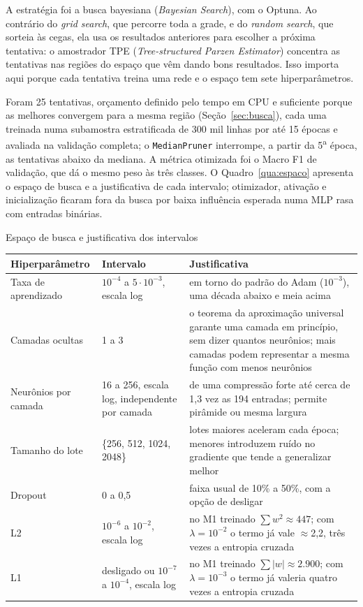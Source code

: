 A estratégia foi a busca bayesiana (\textit{Bayesian Search}), com o Optuna. Ao contrário do \textit{grid search}, que percorre toda a grade, e do \textit{random search}, que sorteia às cegas, ela usa os resultados anteriores para escolher a próxima tentativa: o amostrador TPE (\textit{Tree-structured Parzen Estimator}) concentra as tentativas nas regiões do espaço que vêm dando bons resultados. Isso importa aqui porque cada tentativa treina uma rede e o espaço tem sete hiperparâmetros.

Foram 25 tentativas, orçamento definido pelo tempo em CPU e suficiente porque as melhores convergem para a mesma região (Seção~\ref{sec:busca}), cada uma treinada numa subamostra estratificada de 300 mil linhas por até 15 épocas e avaliada na validação completa; o \texttt{MedianPruner} interrompe, a partir da 5\textsuperscript{a} época, as tentativas abaixo da mediana. A métrica otimizada foi o Macro F1 de validação, que dá o mesmo peso às três classes. O Quadro~\ref{qua:espaco} apresenta o espaço de busca e a justificativa de cada intervalo; otimizador, ativação e inicialização ficaram fora da busca por baixa influência esperada numa MLP rasa com entradas binárias.

\begin{quadro}[!htbp]
\caption{Espaço de busca e justificativa dos intervalos}
\label{qua:espaco}
\begin{center}
\footnotesize
\begin{tabularx}{\textwidth}{|P{2.6cm}|P{3.2cm}|Y|}
\hline
\textbf{Hiperparâmetro} & \textbf{Intervalo} & \textbf{Justificativa} \\ \hline
Taxa de aprendizado & $10^{-4}$ a $5 \cdot 10^{-3}$, escala log & em torno do padrão do Adam ($10^{-3}$), uma década abaixo e meia acima \\ \hline
Camadas ocultas & 1 a 3 & o teorema da aproximação universal \cite{hornik1989} garante uma camada em princípio, sem dizer quantos neurônios; mais camadas podem representar a mesma função com menos neurônios \cite{stathakis2009} \\ \hline
Neurônios por camada & 16 a 256, escala log, independente por camada & de uma compressão forte até cerca de 1,3 vez as 194 entradas; permite pirâmide ou mesma largura \\ \hline
Tamanho do lote & \{256, 512, 1024, 2048\} & lotes maiores aceleram cada época; menores introduzem ruído no gradiente que tende a generalizar melhor \\ \hline
Dropout & 0 a 0,5 & faixa usual de 10\% a 50\%, com a opção de desligar \\ \hline
L2 & $10^{-6}$ a $10^{-2}$, escala log & no M1 treinado $\sum w^2 \approx 447$; com $\lambda = 10^{-2}$ o termo já vale $\approx$2,2, três vezes a entropia cruzada \\ \hline
L1 & desligado ou $10^{-7}$ a $10^{-4}$, escala log & no M1 treinado $\sum |w| \approx 2.900$; com $\lambda = 10^{-3}$ o termo já valeria quatro vezes a entropia cruzada \\ \hline
\end{tabularx}
\end{center}
\end{quadro}


